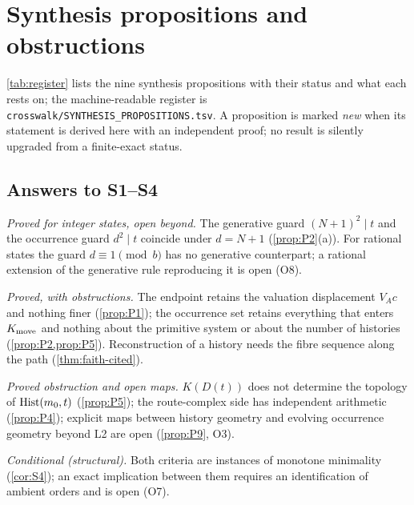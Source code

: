 \section{Synthesis propositions and obstructions}\label{sec:register}
\cref{tab:register} lists the nine synthesis propositions with their status and what each rests on; the machine-readable register is \texttt{crosswalk/SYNTHESIS\_PROPOSITIONS.tsv}. A proposition is marked \emph{new} when its statement is derived here with an independent proof; no result is silently upgraded from a finite-exact status.

\subsection{Answers to S1--S4}
\begin{description}[leftmargin=1.2em,itemsep=2pt]
\item[S1] \emph{Proved for integer states, open beyond.} The generative guard $(N+1)^2\mid t$ and the occurrence guard $d^2\mid t$ coincide under $d=N+1$ (\cref{prop:P2}(a)). For rational states the guard $d\equiv1\pmod b$ has no generative counterpart; a rational extension of the generative rule reproducing it is open (O8).
\item[S2] \emph{Proved, with obstructions.} The endpoint retains the valuation displacement $V_Ac$ and nothing finer (\cref{prop:P1}); the occurrence set retains everything that enters $K_{\mathrm{move}}$ and nothing about the primitive system or about the number of histories (\cref{prop:P2,prop:P5}). Reconstruction of a history needs the fibre sequence along the path (\cref{thm:faith-cited}).
\item[S3] \emph{Proved obstruction and open maps.} $K(D(t))$ does not determine the topology of $\mathrm{Hist}(m_0,t)$ (\cref{prop:P5}); the route-complex side has independent arithmetic (\cref{prop:P4}); explicit maps between history geometry and evolving occurrence geometry beyond L2 are open (\cref{prop:P9}, O3).
\item[S4] \emph{Conditional (structural).} Both criteria are instances of monotone minimality (\cref{cor:S4}); an exact implication between them requires an identification of ambient orders and is open (O7).
\end{description}
